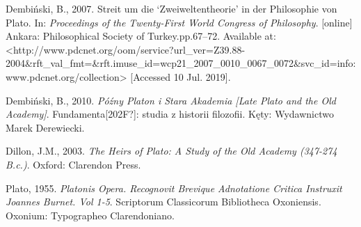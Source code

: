 \documentclass[a4paper]{article}
\begin{document}
Dembiński, B., 2007. Streit um die ‘Zweiweltentheorie’ in der Philosophie von Plato. In: \textit{Proceedings of the
Twenty-First World Congress of Philosophy}. [online] Ankara: Philosophical Society of Turkey.pp.67–72. Available at:
{\textless}http://www.pdcnet.org/oom/service?url\_ver=Z39.88-2004\&rft\_val\_fmt=\&rft.imuse\_id=wcp21\_2007\_0010\_0067\_0072\&svc\_id=info:www.pdcnet.org/collection{\textgreater}
[Accessed 10 Jul. 2019].

Dembiński, B., 2010. \textit{Późny Platon i Stara Akademia [Late Plato and the Old Academy]}. Fundamenta[202F?]: studia
z historii filozofii. Kęty: Wydawnictwo Marek Derewiecki.

Dillon, J.M., 2003. \textit{The Heirs of Plato: A Study of the Old Academy (347-274 B.c.)}. Oxford: Clarendon Press.

Plato, 1955. \textit{Platonis Opera. Recognovit Brevique Adnotatione Critica Instruxit Joannes Burnet. Vol 1-5}.
Scriptorum Classicorum Bibliotheca Oxoniensis. Oxonium: Typographeo Clarendoniano.
\end{document}
